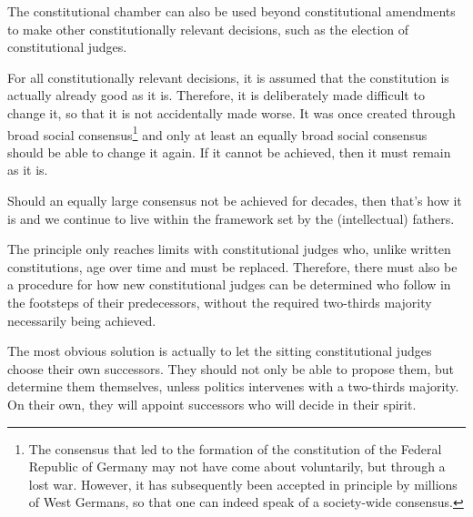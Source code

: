 The constitutional chamber can also be used beyond constitutional amendments to make other
constitutionally relevant decisions, such as the election of
constitutional judges.

For all constitutionally relevant decisions, it is assumed that the constitution
is actually already good as it is. Therefore, it is deliberately made difficult to change it,
so that it is not accidentally made worse. It was once created through broad
social consensus\footnote{The consensus that led to the formation of the constitution
of the Federal Republic of Germany may not have come about voluntarily, but
through a lost war. However, it has subsequently been accepted in principle by millions of West Germans,
so that one can indeed speak of a society-wide consensus.} and only at least an equally broad social consensus should be able to
change it again. If it cannot be achieved, then it must remain as it is.

Should an equally large consensus not be achieved for decades, then that's how it is and
we continue to live within the framework set by the (intellectual) fathers.

The principle only reaches
limits with constitutional judges who, unlike written constitutions,
age over time and must be replaced. Therefore, there must also be a procedure for how new
constitutional judges can be determined who follow in the footsteps of their predecessors, without
the required two-thirds majority necessarily being achieved.

The most obvious solution is
actually to let the sitting constitutional judges choose their own successors. They
should not only be able to propose them, but determine them themselves, unless politics intervenes
with a two-thirds majority. On their own, they will appoint successors who will
decide in their spirit.
